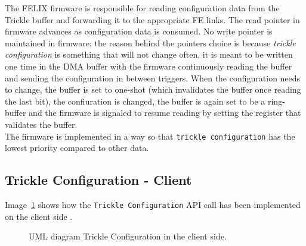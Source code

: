 The \acs{FELIX} firmware is responsible for reading configuration data from the Trickle buffer and forwarding it to the appropriate \acs{FE} links. The read pointer in firmware advances as configuration data is consumed. No write pointer is maintained in firmware; the reason behind the pointers choice is because \textit{trickle configuration} is something that will not change often, it is meant to be written one time in the \acs{DMA} buffer with the firmware continuously reading the buffer and sending the configuration in between triggers. When the configuration needs to change, the buffer is set to one-shot (which invalidates the buffer once reading the last bit), the confiuration is changed, the buffer is again set to be a ring-buffer and the firmware is signaled to resume reading by setting the register that validates the buffer.\\
The firmware is implemented in a way so that \texttt{trickle configuration} has the lowest priority compared to other data.

\subsection{Trickle Configuration - Client}

Image~\ref{fig:trickle-client-uml} shows how the \texttt{Trickle Configuration} \acs{API} call has been implemented on the client side \cite{felix-star-trickle-client}. 

\begin{figure}[htbp]
  \caption{UML diagram Trickle Configuration in the client side.}
  \label{fig:trickle-client-uml}
\end{figure}

